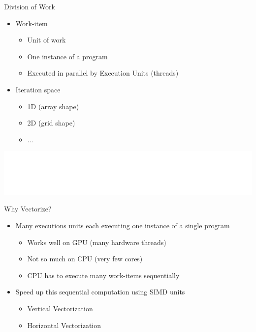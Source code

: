 \begin{frame}{Division of Work}

\begin{itemize}
    \item Work-item
    \begin{itemize}
        \item Unit of work
        \item One instance of a program
        \item Executed in parallel by Execution Units (threads)
    \end{itemize}
    \item Iteration space
    \begin{itemize}
        \item 1D (array shape)
        \item 2D (grid shape)
        \item ...
    \end{itemize}
\end{itemize}

\vspace{4ex}
\hspace{1em}\includegraphics[scale=0.50]{images/work-items.pdf}

\end{frame}


\begin{frame}{Why Vectorize?}

\begin{itemize}
    \item Many executions units each executing one instance of a single program 
    \begin{itemize}
        \item Works well on GPU (many hardware threads)
        \item Not so much on CPU (very few cores)
        \item CPU has to execute many work-items sequentially
    \end{itemize}
    \item Speed up this sequential computation using SIMD units
    \begin{itemize}
        \item Vertical Vectorization
        \item Horizontal Vectorization
    \end{itemize}
\end{itemize}

\end{frame}

